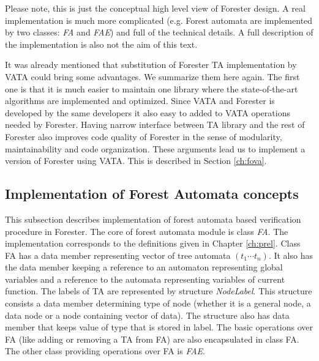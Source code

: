 Please note, this is just the conceptual high level view of Forester design.
A real implementation is much more complicated (e.g. Forest automata are implemented by two classes: \emph{FA} and \emph{FAE})
and full of the technical details.
A full description of the implementation is also not the aim of this text.

It was already mentioned that substitution of Forester TA implementation by
VATA could bring some advantages.
We summarize them here again.
The first one is that it is much easier to maintain one library where
the state-of-the-art algorithms are implemented and optimized.
Since VATA and Forester is developed by the same developers it also easy to added
to VATA operations needed by Forester.
Having narrow interface between TA library and the rest of Forester
also improves code quality of Forester in the sense of modularity, maintainability and code organization.
These arguments lead us to implement a version of Forester using VATA.
This is described in Section \ref{ch:fova}.


\subsection{Implementation of Forest Automata concepts}

This subsection describes implementation of forest automata based verification procedure in Forester.
The core of forest automata module is class \emph{FA}.
The implementation corresponds to the definitions given in Chapter \ref{ch:prel}.
Class FA has a data member representing vector of tree automata $(t_1 \cdots t_n)$.
It also has the data member keeping a reference to an automaton representing global variables
and a reference to the automata representing variables of current function. %
The labels of TA are represented by structure \emph{NodeLabel}.
This structure consists a data member determining type of node
(whether it is a general node, a data node or a node containing vector of data).
The structure also has data member that keeps value of type that is stored in label.
The basic operations over FA (like adding or removing a TA from FA) are also encapsulated in class FA.
The other class providing operations over FA is \emph{FAE}. 

